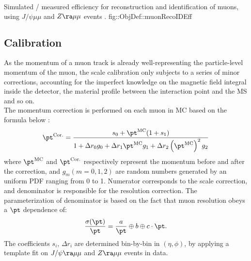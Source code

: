 { Simulated / measured efficiency for reconstruction and identification of muons, using $J/\psi\mu\mu$ and $Z\ra\mu\mu$ events \cite{166_muonPerformance2015data}.}
{fig::ObjDef::muonRecoIDEff}





\subsection{Calibration} \label{sec::objDef::muons::calib}
As the momentum of a muon track is already well-representing the particle-level momentum of the muon, 
the scale calibration only subjects to a series of minor corrections, accounting for the imperfect knowledge on the magnetic field integral inside the detector, the material profile between the interaction point and the MS and so on. \\

The momentum correction is performed on each muon in MC based on the formula below \cite{165_muonPerf2011_2012}:
\begin{align}
\pt^{\mathrm{Cor.}} = \frac{ s_0  + \pt^{\mathrm{MC}}  (1+s_1) } {1+ \Delta r_0  g_0  + \Delta r_1 
 \pt^{\mathrm{MC}} g_1  + \Delta r_2 \left( \pt^{\mathrm{MC}} \right)^2  g_2} 
\end{align}
where $\pt^{\mathrm{MC}}$ and $\pt^{\mathrm{Cor.}}$ respectively represent the momentum before and after the correction, and $g_m (m=0,1,2)$ are random numbers generated by an uniform PDF ranging from 0 to 1.
Numerator corresponds to the scale correction, and denominator is responsible for the resolution correction. The parameterization of denominator is based on the fact that muon resolution obeys a $\pt$ dependence of:
\begin{align}
\frac{\sigma(\pt)}{\pt} = \frac{a}{\pt} \oplus b \oplus c \cdot \pt.
\end{align}
%
The coefficients $s_i$, $\Delta r_i$ are determined bin-by-bin in $(\eta,\phi)$, 
by applying a template fit on $J/\psi\ra \mu\mu$ and $Z\ra \mu\mu$ events in data. \\




